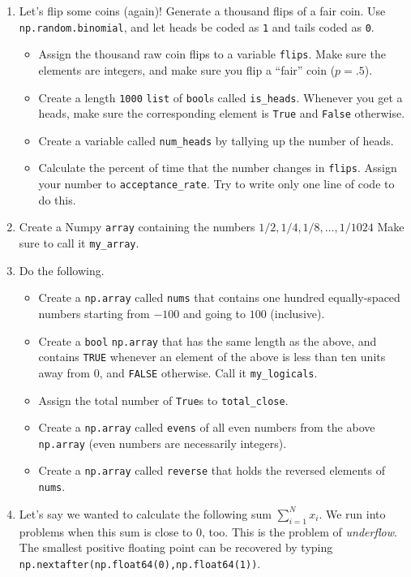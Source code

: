 \documentclass[12pt,krantz2]{krantz}
\providecommand{\tightlist}{%
  \setlength{\itemsep}{0pt}\setlength{\parskip}{0pt}}
\begin{document}
\begin{enumerate}
\def\labelenumi{\arabic{enumi}.}
\item
  Let's flip some coins (again)! Generate a thousand flips of a fair coin. Use \texttt{np.random.binomial}, and let heads be coded as \texttt{1} and tails coded as \texttt{0}.

  \begin{itemize}
  \tightlist
  \item
    Assign the thousand raw coin flips to a variable \texttt{flips}. Make sure the elements are integers, and make sure you flip a ``fair'' coin (\(p=.5\)).
  \item
    Create a length \texttt{1000} \texttt{list} of \texttt{bool}s called \texttt{is\_heads}. Whenever you get a heads, make sure the corresponding element is \texttt{True} and \texttt{False} otherwise.
  \item
    Create a variable called \texttt{num\_heads} by tallying up the number of heads.
  \item
    Calculate the percent of time that the number changes in \texttt{flips}. Assign your number to \texttt{acceptance\_rate}. Try to write only one line of code to do this.
  \end{itemize}
\item
  Create a Numpy \texttt{array} containing the numbers \(1/2, 1/4, 1/8, \ldots, 1/1024\) Make sure to call it \texttt{my\_array}.
\item
  Do the following.

  \begin{itemize}
  \tightlist
  \item
    Create a \texttt{np.array} called \texttt{nums} that contains one hundred equally-spaced numbers starting from \(-100\) and going to \(100\) (inclusive).
  \item
    Create a \texttt{bool} \texttt{np.array} that has the same length as the above, and contains \texttt{TRUE} whenever an element of the above is less than ten units away from \(0\), and \texttt{FALSE} otherwise. Call it \texttt{my\_logicals}.
  \item
    Assign the total number of \texttt{True}s to \texttt{total\_close}.
  \item
    Create a \texttt{np.array} called \texttt{evens} of all even numbers from the above \texttt{np.array} (even numbers are necessarily integers).
  \item
    Create a \texttt{np.array} called \texttt{reverse} that holds the reversed elements of \texttt{nums}.
  \end{itemize}
\item
  Let's say we wanted to calculate the following sum \(\sum_{i=1}^N x_i\). We run into problems when this sum is close to \(0\), too. This is the problem of \emph{underflow}. The smallest positive floating point can be recovered by typing \texttt{np.nextafter(np.float64(0),np.float64(1))}.


\end{enumerate}
\end{document}
